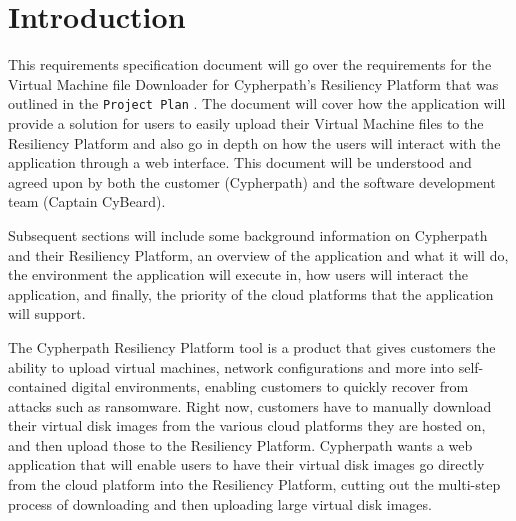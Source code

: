 \documentclass{article}
\begin{document}
    


    \tableofcontents
    \newpage
    \listoffigures


    \newpage
    \begin{versionhistory}
    \end{versionhistory}
    \newpage


    \section{Introduction}
    This requirements specification document will go over the requirements for the Virtual Machine file Downloader for Cypherpath's Resiliency Platform that was outlined in the
    \texttt{Project Plan} \cite{projectplan}.
    The document will cover how the application will provide a solution for users to easily upload their Virtual Machine files to the Resiliency Platform and also
    go in depth on how the users will interact with the application through a web interface. This document will be understood and agreed
    upon by both the customer (Cypherpath) and the software development team (Captain CyBeard).

    Subsequent sections will include some background information on Cypherpath and their Resiliency Platform, an overview of the application and what it
    will do, the environment the application will execute in, how users will interact the application, and finally, the priority of the cloud platforms that the application will support.

	The Cypherpath Resiliency Platform tool is a product that gives customers the ability to upload virtual machines, network configurations and more into 
    self-contained digital environments, enabling customers to quickly recover from attacks such as ransomware. Right now, customers have to manually download their virtual disk images from
    the various cloud platforms they are hosted on, and then upload those to the Resiliency Platform. Cypherpath wants a web application that will enable users to have their virtual disk images go
    directly from the cloud platform into the Resiliency Platform, cutting out the multi-step process of downloading and then uploading large virtual disk images.
	
\end{document}
